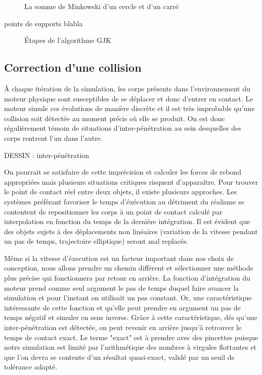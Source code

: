 \begin{figure}
  
  \caption{La somme de Minkowski d'un cercle et d'un carré}
\end{figure}

points de supports blabla

\begin{figure}
  
  \caption{{\'E}tapes de l'algorithme GJK}
\end{figure}

\subsection{Correction d'une collision}

\`A chaque itération de la simulation, les corps présents dans l'environnement du moteur physique sont susceptibles de se déplacer et donc d'entrer en contact. Le moteur simule ces évolutions de manière discrète et il est très improbable qu'une collision soit détectée au moment précis o\`u elle se produit. On est donc régulièrement témoin de situations d'inter-pénétration au sein desquelles des corps rentrent l'un dans l'autre.

DESSIN : inter-pénétration

On pourrait se satisfaire de cette imprécision et calculer les forces de rebond appropriées mais plusieurs situations critiques risquent d'apparaître. Pour trouver le point de contact réel entre deux objets, il existe plusieurs approches. Les systèmes préférant favoriser le temps d'éxécution au détriment du réalisme se contentent de repositionner les corps à un point de contact calculé par interpolation en fonction du temps de la dernière intégration. Il est évident que des objets sujets à des déplacements non linéaires (variation de la vitesse pendant un pas de temps, trajectoire elliptique) seront mal replacés.

Même si la vitesse d'éxecution est un facteur important dans nos choix de conception, nous allons prendre un chemin différent et sélectionner une méthode plus précise qui fonctionnera par retour en arrière. La fonction d'intégration du moteur prend comme seul argument le pas de temps duquel faire avancer la simulation et pour l'instant on utilisait un pas constant. Or, une caractéristique intéressante de cette fonction et qu'elle peut prendre en argument un pas de temps négatif et simuler en sens inverse. Grâce à cette caractéristique, dés qu'une inter-pénétration est détectée, on peut revenir en arrière jusqu'à retrouver le temps de contact exact. Le terme "exact" est à prendre avec des pincettes puisque notre simulation est limité par l'arithmétique des nombres à virgules flottantes et que l'on devra se contente d'un résultat quasi-exact, validé par un seuil de tolérance adapté.

